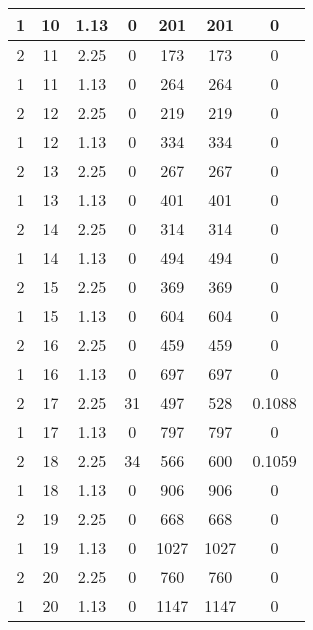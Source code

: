 \documentclass[letterpaper, 12pt]{article}
\begin{document}
\begin{longtable}{|c|c|c|c|c|c|c|}
\hline
1 & 10 & 1.13 & 0 & 201 & 201 & 0 \\
\hline
2 & 11 & 2.25 & 0 & 173 & 173 & 0 \\
\hline
1 & 11 & 1.13 & 0 & 264 & 264 & 0 \\
\hline
2 & 12 & 2.25 & 0 & 219 & 219 & 0 \\
\hline
1 & 12 & 1.13 & 0 & 334 & 334 & 0 \\
\hline
2 & 13 & 2.25 & 0 & 267 & 267 & 0 \\
\hline
1 & 13 & 1.13 & 0 & 401 & 401 & 0 \\
\hline
2 & 14 & 2.25 & 0 & 314 & 314 & 0 \\
\hline
1 & 14 & 1.13 & 0 & 494 & 494 & 0 \\
\hline
2 & 15 & 2.25 & 0 & 369 & 369 & 0 \\
\hline
1 & 15 & 1.13 & 0 & 604 & 604 & 0 \\
\hline
2 & 16 & 2.25 & 0 & 459 & 459 & 0 \\
\hline
1 & 16 & 1.13 & 0 & 697 & 697 & 0 \\
\hline
2 & 17 & 2.25 & 31 & 497 & 528 & 0.1088 \\
\hline
1 & 17 & 1.13 & 0 & 797 & 797 & 0 \\
\hline
2 & 18 & 2.25 & 34 & 566 & 600 & 0.1059 \\
\hline
1 & 18 & 1.13 & 0 & 906 & 906 & 0 \\
\hline
2 & 19 & 2.25 & 0 & 668 & 668 & 0 \\
\hline
1 & 19 & 1.13 & 0 & 1027 & 1027 & 0 \\
\hline
2 & 20 & 2.25 & 0 & 760 & 760 & 0 \\
\hline
1 & 20 & 1.13 & 0 & 1147 & 1147 & 0 \\
\hline
\end{longtable}
\end{document}

